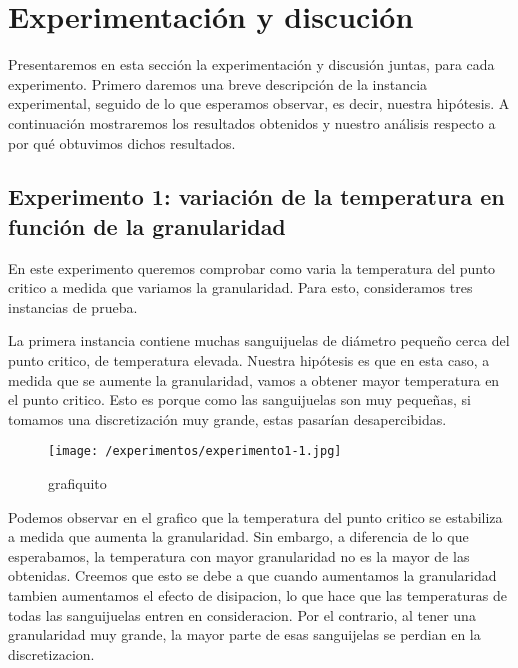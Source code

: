 \section{Experimentaci\'on y discuci\'on}

Presentaremos en esta sección la experimentación y discusión juntas, para cada experimento. Primero 
daremos una breve descripción de la instancia 
experimental, seguido de lo que esperamos observar, es decir, nuestra hipótesis. A continuación mostraremos los 
resultados obtenidos y nuestro análisis respecto a por qué obtuvimos dichos resultados. 

\subsection{Experimento 1: variación de la temperatura en función de la granularidad}

En este experimento queremos comprobar como varia la temperatura del punto critico a medida que variamos la granularidad. Para esto, consideramos tres instancias de prueba.

La primera instancia contiene muchas %
sanguijuelas de diámetro peque\~no cerca del punto critico, de temperatura elevada. %
Nuestra hipótesis es que en esta caso, a medida que se aumente la granularidad, vamos a obtener mayor temperatura en el punto critico. Esto es porque como las sanguijuelas son muy peque\~nas, si tomamos una discretizaci\'on muy grande, estas pasarían desapercibidas.


\begin{figure}[h]
    \texttt{[image: /experimentos/experimento1-1.jpg]}
    \caption{grafiquito}
\end{figure}

Podemos observar en el grafico que la temperatura del punto critico se estabiliza a medida que aumenta la granularidad. Sin embargo, a diferencia de lo que esperabamos, la temperatura con mayor granularidad no es la mayor de las obtenidas. Creemos que esto se debe a que 
cuando aumentamos la granularidad tambien aumentamos el efecto de disipacion, lo que hace que
las temperaturas de todas las sanguijuelas entren en consideracion. Por el contrario, al tener una granularidad muy grande, la mayor parte de esas sanguijelas se perdian en la discretizacion. 

